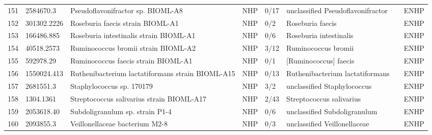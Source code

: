 \begin{longtable}{llllllll}
151 &     2584670.3 &                                        Pseudoflavonifractor sp. BIOML-A8 &   NHP &      0/17 &              unclassified Pseudoflavonifractor &      \cite{poyet2019library,ricaboni2017pseudoflavonifractor} &  ENHP \\
152 &   301302.2226 &                                         Roseburia faecis strain BIOML-A1 &   NHP &       0/2 &                               Roseburia faecis &                    \cite{poyet2019library,duncan2006proposal} &  ENHP \\
153 &    166486.885 &                                   Roseburia intestinalis strain BIOML-A1 &   NHP &       0/6 &                         Roseburia intestinalis &                           \cite{poyet2019library,la2019human} &  ENHP \\
154 &    40518.2573 &                                      Ruminococcus bromii strain BIOML-A2 &   NHP &      3/12 &                            Ruminococcus bromii &                          \cite{poyet2019library,ze2015unique} &  ENHP \\
155 &     592978.29 &                                      Ruminococcus faecis strain BIOML-A1 &   NHP &       0/1 &                          [Ruminococcus] faecis &                   \cite{poyet2019library,kim2011ruminococcus} &  ENHP \\
156 &   1550024.413 &                         Ruthenibacterium lactatiformans strain BIOML-A15 &   NHP &      0/13 &                Ruthenibacterium lactatiformans &         \cite{poyet2019library,shkoporov2016ruthenibacterium} &  ENHP \\
157 &     2681551.3 &                                                Staphylococcus sp. 170179 &   NHP &       3/2 &                    unclassified Staphylococcus &                                 \cite{pain2020staphylococcus} &  ENHP \\
158 &     1304.1361 &                                Streptococcus salivarius strain BIOML-A17 &   NHP &      2/43 &                       Streptococcus salivarius &                          \cite{poyet2019library,kaci2014anti} &  ENHP \\
159 &    2053618.40 &                                          Subdoligranulum sp. strain P1-4 &   NHP &       0/6 &                   unclassified Subdoligranulum &                           \cite{holmstrom2004subdoligranulum} &  ENHP \\
160 &     2093855.3 &                                           Veillonellaceae bacterium M2-8 &   NHP &       0/3 &                   unclassified Veillonellaceae &                           \cite{glascock2020unique,2093855.3} &  ENHP \\

\end{longtable}
